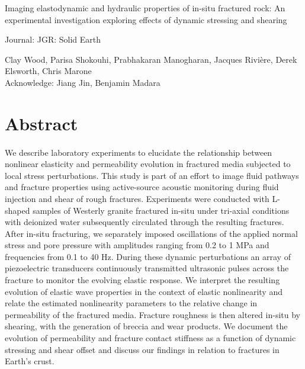 \documentclass[letterpaper,10pt]{article}
\begin{document}
	
	
	\doublespacing
	\begin{center}
		\huge Imaging elastodynamic and hydraulic properties of in-situ fractured rock: An experimental investigation exploring effects of dynamic stressing and shearing
		
		\quad
		
		\large Journal: JGR: Solid Earth
		
		\quad
		
		\large Clay Wood, Parisa Shokouhi, Prabhakaran Manogharan, Jacques Rivi\`{e}re, Derek Elsworth, Chris Marone \\
		\large Acknowledge: Jiang Jin, Benjamin Madara
		
	\end{center}
	\clearpage
	
	
	
	
	
	\section{Abstract}
	\paragraph{}
	We describe laboratory experiments to elucidate the relationship between nonlinear elasticity and permeability evolution in fractured media subjected to local stress perturbations. This study is part of an effort to image fluid pathways and fracture properties using active-source acoustic monitoring during fluid injection and shear of rough fractures. Experiments were conducted with L-shaped samples of Westerly granite fractured in-situ under tri-axial conditions with deionized water subsequently circulated through the resulting fractures. After in-situ fracturing, we separately imposed oscillations of the applied normal stress and pore pressure with amplitudes ranging from 0.2 to 1 MPa and frequencies from 0.1 to 40 Hz. During these dynamic perturbations an array of piezoelectric transducers continuously transmitted ultrasonic pulses across the fracture to monitor the evolving  elastic response. We interpret the resulting evolution of elastic wave properties in the context of elastic nonlinearity and relate the estimated nonlinearity parameters to the relative change in permeability of the fractured media. Fracture roughness is then altered in-situ by shearing, with the generation of breccia and wear products. We document the evolution of permeability and fracture contact stiffness as a function of dynamic stressing and shear offset and discuss our findings in relation to fractures in Earth's crust.
	\clearpage
	
\end{document}
